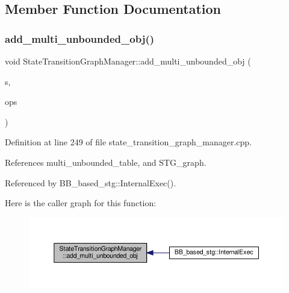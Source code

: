 \subsection{Member Function Documentation}
\mbox{\label{classStateTransitionGraphManager_a68c5f876edcd76e7cc218d38623c043e}} 
\subsubsection{\texorpdfstring{add\+\_\+multi\+\_\+unbounded\+\_\+obj()}{add\_multi\_unbounded\_obj()}}
{\footnotesize\ttfamily void State\+Transition\+Graph\+Manager\+::add\+\_\+multi\+\_\+unbounded\+\_\+obj (\begin{DoxyParamCaption}\item[{\hyperlink{graph_8hpp_abefdcf0544e601805af44eca032cca14}{vertex}}]{s,  }\item[{const \hyperlink{classCustomOrderedSet}{Custom\+Ordered\+Set}$<$ \hyperlink{graph_8hpp_abefdcf0544e601805af44eca032cca14}{vertex} $>$ \&}]{ops }\end{DoxyParamCaption})}



Definition at line 249 of file state\+\_\+transition\+\_\+graph\+\_\+manager.\+cpp.



References multi\+\_\+unbounded\+\_\+table, and S\+T\+G\+\_\+graph.



Referenced by B\+B\+\_\+based\+\_\+stg\+::\+Internal\+Exec().

Here is the caller graph for this function\+:
\nopagebreak
\begin{figure}[H]
\begin{center}
\leavevmode
\includegraphics[width=350pt]{d9/dfd/classStateTransitionGraphManager_a68c5f876edcd76e7cc218d38623c043e_icgraph}
\end{center}
\end{figure}
\mbox{\label{classStateTransitionGraphManager_a93645ec1387a4b918e01ee4eeec5c658}} 
